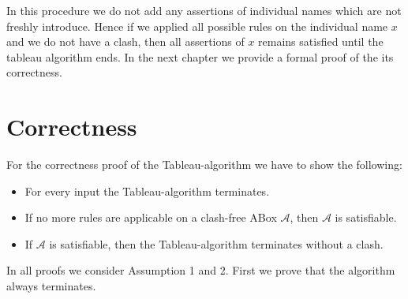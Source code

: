 \documentclass{book}
\theoremstyle{break}
\theoremstyle{definition}
\begin{document}
\begin{figure}[H]
\centering
{}
\end{figure}
In this procedure we do not add any assertions of individual names which are not freshly introduce. Hence if we applied all possible rules on the individual name $x$ and we do not have a clash, then all assertions of $x$ remains satisfied until the tableau algorithm ends. In the next chapter we provide a formal proof of the its correctness.
\chapter{Correctness}
For the correctness proof of the Tableau-algorithm we have to show the following:
\begin{itemize}
\item For every input the Tableau-algorithm terminates.
\item If no more rules are applicable on a clash-free ABox $\mathcal{A}$, then $\mathcal{A}$ is satisfiable.
\item If $\mathcal{A}$ is satisfiable, then the Tableau-algorithm terminates without a clash.
\end{itemize}
In all proofs we consider Assumption 1 and 2. First we prove that the algorithm always terminates.
\end{document}
